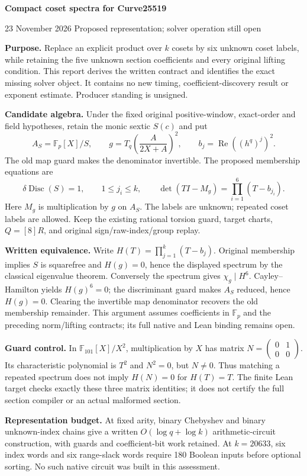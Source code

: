 \documentclass[10pt]{article}
\begin{document}
{\Large\bfseries\color{ink} Compact coset spectra for Curve25519}\par
{\small 23 November 2026 \quad Proposed representation; solver operation still open}

\textbf{Purpose.} Replace an explicit product over $k$ cosets by six unknown
coset labels, while retaining the five unknown section coefficients and every
original lifting condition. This report derives the written contract and
identifies the exact missing solver object. It contains no new timing,
coefficient-discovery result or exponent estimate. Producer standing is unsigned.

\textbf{Candidate algebra.} Under the fixed original positive-window,
exact-order and field hypotheses, retain the monic sextic $S(c)$ and put
\[
 A_S=\mathbb F_p[X]/S,\qquad
 g=T_q\!\left(\frac{A}{2X+A}\right)^2,\qquad
 b_j=\operatorname{Re}((h^q)^j)^2.
\]
The old map guard makes the denominator invertible. The proposed membership
equations are
\[
 \delta\operatorname{Disc}(S)=1,\qquad 1\le j_i\le k,\qquad
 \det(TI-M_g)=\prod_{i=1}^{6}(T-b_{j_i}).
\]
Here $M_g$ is multiplication by $g$ on $A_S$. The labels are unknown;
repeated coset labels are allowed. Keep the existing rational torsion guard,
target charts, $Q=[8]R$, and original sign/raw-index/group replay.

\textbf{Written equivalence.} Write $H(T)=\prod_{j=1}^{k}(T-b_j)$.
Original membership implies $S$ is squarefree and $H(g)=0$, hence the
displayed spectrum by the classical eigenvalue theorem. Conversely the
spectrum gives $\chi_g\mid H^6$. Cayley--Hamilton yields $H(g)^6=0$;
the discriminant guard makes $A_S$ reduced, hence $H(g)=0$. Clearing the
invertible map denominator recovers the old membership remainder. This
argument assumes coefficients in $\mathbb F_p$ and the preceding norm/lifting
contracts; its full native and Lean binding remains open.

\textbf{Guard control.} In $\mathbb F_{101}[X]/X^2$, multiplication by $X$
has matrix $N=\left(\begin{smallmatrix}0&1\\0&0\end{smallmatrix}\right)$.
Its characteristic polynomial is $T^2$ and $N^2=0$, but $N\ne0$.
Thus matching a repeated spectrum does not imply $H(N)=0$ for $H(T)=T$.
The finite Lean target checks exactly these three matrix identities; it
does not certify the full section compiler or an actual malformed section.

\textbf{Representation budget.} At fixed arity, binary Chebyshev and binary
unknown-index chains give a written $O(\log q+\log k)$ arithmetic-circuit
construction, with guards and coefficient-bit work retained. At $k=20633$,
six index words and six range-slack words require 180 Boolean inputs before
optional sorting. No such native circuit was built in this assessment.
\end{document}
